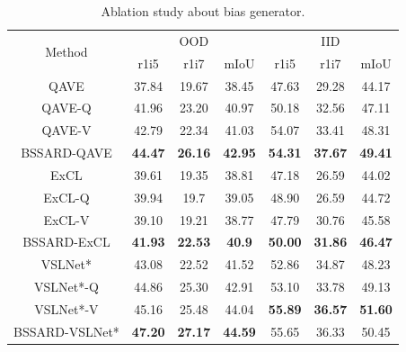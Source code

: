 \begin{table}[t]
	\centering
	\renewcommand{\arraystretch}{1}
	\setlength{\tabcolsep}{0.4mm}
	\begin{tabular}{c c c c | c c c}
		\toprule
		\multirow{2}{*}{Method} & \multicolumn{3}{c}{OOD} & \multicolumn{3}{c}{IID}\\
		& r1i5 & r1i7 & mIoU & r1i5 & r1i7 & mIoU \\
		\midrule
		QAVE & 37.84 & 19.67 & 38.45 & 47.63 & 29.28 & 44.17 \\
		QAVE-Q & 41.96 & 23.20 & 40.97 & 50.18 & 32.56 & 47.11 \\
		QAVE-V & 42.79 & 22.34 & 41.03 & 54.07 & 33.41 & 48.31 \\
		BSSARD-QAVE & \bf 44.47 & \bf 26.16 & \bf 42.95 & \bf 54.31 & \bf 37.67 & \bf 49.41 \\
		\midrule
		ExCL & 39.61 & 19.35 & 38.81 & 47.18 & 26.59 & 44.02\\
		ExCL-Q & 39.94 & 19.7 & 39.05 & 48.90 & 26.59 & 44.72 \\
		ExCL-V & 39.10 & 19.21 & 38.77 & 47.79 & 30.76 &  45.58 \\
		BSSARD-ExCL & {\bf 41.93} & {\bf 22.53} & {\bf 40.9} & \bf 50.00 & \bf 31.86 & \bf 46.47 \\
		\midrule
		VSLNet* & 43.08 & 22.52 & 41.52 & 52.86 & 34.87 &  48.23 \\	
		VSLNet*-Q & 44.86 & 25.30 & 42.91 & 53.10 & 33.78 & 49.13 \\
		VSLNet*-V & 45.16 & 25.48 & 44.04 & {\bf 55.89} & {\bf 36.57} &  {\bf 51.60}\\
		BSSARD-VSLNet* & {\bf 47.20} & {\bf 27.17} & {\bf 44.59} & 55.65 & 36.33 & 50.45 \\
		\bottomrule
	\end{tabular}
	\caption{Ablation study about bias generator.}
	\label{backbones_charades_cd}
\end{table}


